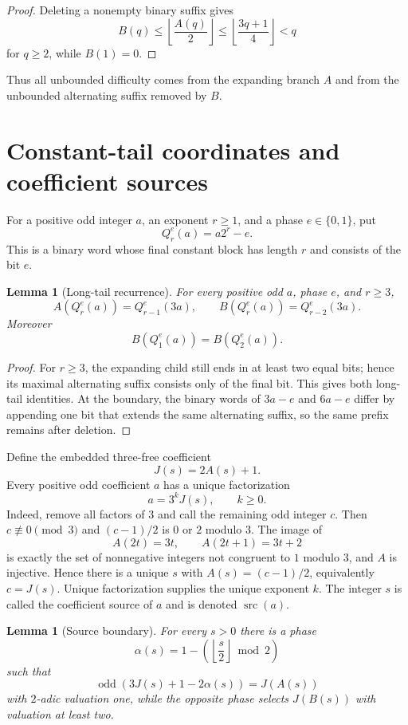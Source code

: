 \documentclass[11pt]{article}
\newtheorem{lemma}[theorem]{Lemma}
\newcommand{\odd}{\operatorname{odd}}
\newcommand{\src}{\operatorname{src}}
\begin{document}
\begin{proof}
Deleting a nonempty binary suffix gives
\[
  B(q)\le \left\lfloor\frac{A(q)}2\right\rfloor
       \le \left\lfloor\frac{3q+1}{4}\right\rfloor<q
\]
for $q\ge2$, while $B(1)=0$.
\end{proof}

Thus all unbounded difficulty comes from the expanding branch $A$ and from the
unbounded alternating suffix removed by $B$.

\section{Constant-tail coordinates and coefficient sources}

For a positive odd integer $a$, an exponent $r\ge1$, and a phase
$e\in\{0,1\}$, put
\[
  Q_r^e(a)=a2^r-e.
\]
This is a binary word whose final constant block has length $r$ and consists
of the bit $e$.

\begin{lemma}[Long-tail recurrence]\label{lem:long-tail}
For every positive odd $a$, phase $e$, and $r\ge3$,
\[
  A(Q_r^e(a))=Q_{r-1}^e(3a),\qquad
  B(Q_r^e(a))=Q_{r-2}^e(3a).
\]
Moreover
\[
  B(Q_1^e(a))=B(Q_2^e(a)).
\]
\end{lemma}

\begin{proof}
For $r\ge3$, the expanding child still ends in at least two equal bits; hence
its maximal alternating suffix consists only of the final bit. This gives both
long-tail identities. At the boundary, the binary words of $3a-e$ and $6a-e$
differ by appending one bit that extends the same alternating suffix, so the
same prefix remains after deletion.
\end{proof}

Define the embedded three-free coefficient
\[
  J(s)=2A(s)+1.
\]
Every positive odd coefficient $a$ has a unique factorization
\[
  a=3^kJ(s),\qquad k\ge0.
\]
Indeed, remove all factors of $3$ and call the remaining odd integer $c$.
Then $c\not\equiv0\pmod3$ and $(c-1)/2$ is $0$ or $2$ modulo $3$.
The image of
\[
 A(2t)=3t,\qquad A(2t+1)=3t+2
\]
is exactly the set of nonnegative integers not congruent to $1$ modulo $3$,
and $A$ is injective. Hence there is a unique $s$ with
$A(s)=(c-1)/2$, equivalently $c=J(s)$. Unique factorization supplies the
unique exponent $k$. The integer $s$ is called the coefficient source of
$a$ and is denoted $\src(a)$.

\begin{lemma}[Source boundary]\label{lem:source-boundary}
For every $s>0$ there is a phase
\[
  \alpha(s)=1-\left(\left\lfloor\frac{s}{2}\right\rfloor\bmod2\right)
\]
such that
\[
  \odd(3J(s)+1-2\alpha(s))=J(A(s))
\]
with $2$-adic valuation one, while the opposite phase selects $J(B(s))$ with
valuation at least two.
\end{lemma}
\end{document}
